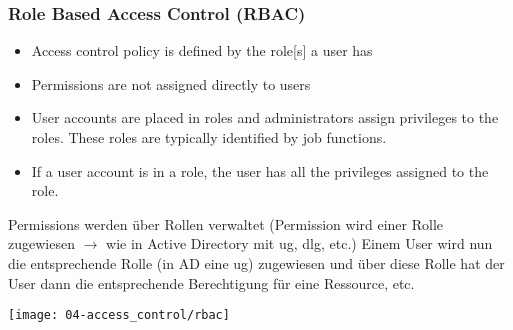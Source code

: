 \subsubsection{Role Based Access Control (RBAC)}
\begin{itemize}
    \item Access control policy is defined by the role[s] a user has
    \item Permissions are not assigned directly to users
    \item User accounts are placed in roles and administrators assign privileges to the roles. These roles are typically identified by job functions.
    \item If a user account is in a role, the user has all the privileges assigned to the role.\\
\end{itemize}

Permissions werden über Rollen verwaltet (Permission wird einer Rolle zugewiesen $\rightarrow$ wie in Active Directory mit ug, dlg, etc.)
Einem User wird nun die entsprechende Rolle (in AD eine ug) zugewiesen und über diese Rolle hat der User dann die entsprechende Berechtigung für eine Ressource, etc.

\begin{center}
    \texttt{[image: 04-access\_control/rbac]}
    \vspace{-8pt}
\end{center}

